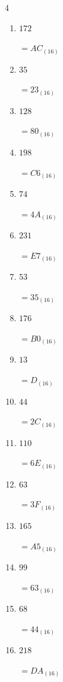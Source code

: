 \begin{multicols}{4}
\begin{enumerate}
  \item $172$

        $=AC_{(16)}$

  \item $35$

        $=23_{(16)}$

  \item $128$

        $=80_{(16)}$

  \item $198$

        $=C6_{(16)}$

  \item $74$

        $=4A_{(16)}$

  \item $231$

        $=E7_{(16)}$

  \item $53$

        $=35_{(16)}$

  \item $176$

        $=B0_{(16)}$

\columnbreak %

\resetques

  \item $13$

        $=D_{(16)}$

  \item $44$

        $=2C_{(16)}$

  \item $110$

        $=6E_{(16)}$

  \item $63$

        $=3F_{(16)}$

  \item $165$

        $=A5_{(16)}$

  \item $99$

        $=63_{(16)}$

  \item $68$

        $=44_{(16)}$

  \item $218$

        $=DA_{(16)}$


\end{enumerate}
\end{multicols}
